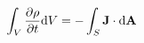 \documentclass[preview]{standalone}
\begin{document}
\begin{align*}
\int_{V}\pdv{\rho}{t}\dd V = -\int_S \textbf{J}\cdot \text{d}\textbf{A}
\end{align*}
\end{document}
